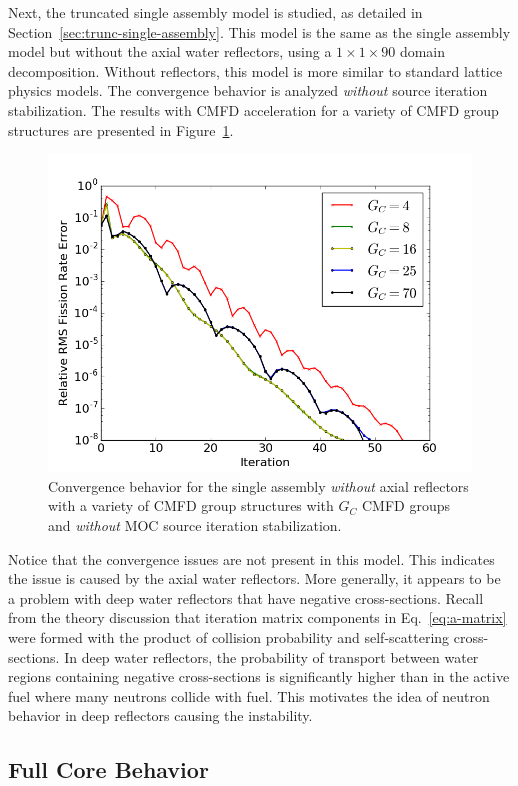 Next, the truncated single assembly model is studied, as detailed in Section~\ref{sec:trunc-single-assembly}. This model is the same as the single assembly model but without the axial water reflectors, using a $1\times 1\times 90$ domain decomposition. Without reflectors, this model is more similar to standard lattice physics models. The convergence behavior is analyzed \textit{without} source iteration stabilization. The results with \ac{CMFD} acceleration for a variety of \ac{CMFD} group structures are presented in Figure~\ref{fig:truncated-convergence}.
\begin{figure}[ht!]
	\centering
	\includegraphics[width=0.65\linewidth]{figures/convergence/sa_trunc_no_stab.png}
	\caption{Convergence behavior for the single assembly \textit{without} axial reflectors with a variety of \ac{CMFD} group structures with $G_C$ \ac{CMFD} groups and \textit{without} \ac{MOC} source iteration stabilization.}
	\label{fig:truncated-convergence}
\end{figure}
Notice that the convergence issues are not present in this model. This indicates the issue is caused by the axial water reflectors. More generally, it appears to be a problem with deep water reflectors that have negative cross-sections. Recall from the theory discussion that iteration matrix components in Eq.~\ref{eq:a-matrix} were formed with the product of collision probability and self-scattering cross-sections. In deep water reflectors, the probability of transport between water regions containing negative cross-sections is significantly higher than in the active fuel where many neutrons collide with fuel. This motivates the idea of neutron behavior in deep reflectors causing the instability. 

\subsection{Full Core Behavior}

